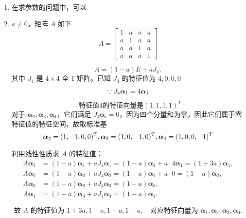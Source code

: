 \documentclass[./linear_algebra.tex]{subfiles}
\begin{document}
    \begin{enumerate}
        \item 在求参数的问题中，可以{\color[rgb]{0.2, 0.6, 0.3}{由特征向量可构造方程组}}
        \item $a \neq 0$，矩阵 $A$ 如下
        \[
            A =
            \begin{bmatrix}
                1 & a & a & a \\
                a & 1 & a & a \\
                a & a & 1 & a \\
                a & a & a & 1
            \end{bmatrix}

        \]
        \begin{analysisbox}
            \[
                A = (1-a)E + a J_4,
            \]
            其中 $J_4$ 是 $4 \times 4$ 全 $1$ 矩阵。已知 $J_4$ 的特征值为 $4,0,0,0$
            \[
                \because J_4 \bm{\alpha}_1 = 4 \bm{\alpha}_1 \\
            \]
            \[
                \therefore \text{特征值}4\text{的特征向量是}(1,1,1,1)^T
            \]
            对于 $\bm{\alpha}_2, \bm{\alpha}_3, \bm{\alpha}_4$，它们满足 $J_4 \bm{\alpha}_i = 0$，因为四个分量和为零，因此它们属于零特征值的特征空间，故取标准基
            \[
                \bm{\alpha}_2 = (1,-1,0,0)^T, \\
                \bm{\alpha}_3 = (1,0,-1,0)^T, \\
                \bm{\alpha}_4 = (1,0,0,-1)^T
            \]

            利用线性性质求 $A$ 的特征值：
            \[
                \begin{aligned}
                    A \bm{\alpha}_1 &= (1-a) \bm{\alpha}_1 + a J_4 \bm{\alpha}_1 = (1-a)\bm{\alpha}_1 + a \cdot 4 \bm{\alpha}_1 = (1+3a) \bm{\alpha}_1, \\
                    A \bm{\alpha}_2 &= (1-a)\bm{\alpha}_2 + a J_4 \bm{\alpha}_2 = (1-a)\bm{\alpha}_2 + a \cdot 0 = (1-a)\bm{\alpha}_2, \\
                    A \bm{\alpha}_3 &= (1-a)\bm{\alpha}_3 + a J_4 \bm{\alpha}_3 = (1-a)\bm{\alpha}_3, \\
                    A \bm{\alpha}_4 &= (1-a)\bm{\alpha}_4 + a J_4 \bm{\alpha}_4 = (1-a)\bm{\alpha}_4.
                \end{aligned}
            \]

            \[
                \text{故 $A$ 的特征值为 } 1+3a, 1-a, 1-a, 1-a, \quad \text{对应特征向量为 } \bm{\alpha}_1, \bm{\alpha}_2, \bm{\alpha}_3, \bm{\alpha}_4.
            \]
        \end{analysisbox}
    \end{enumerate}
\end{document}
